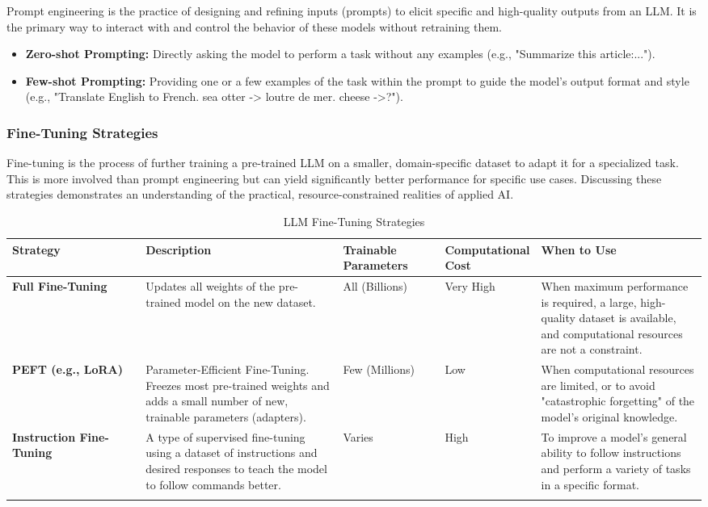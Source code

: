 \documentclass[11pt,a4paper]{article}
\begin{document}
Prompt engineering is the practice of designing and refining inputs (prompts) to elicit specific and high-quality outputs from an LLM. It is the primary way to interact with and control the behavior of these models without retraining them.
\begin{itemize}
    \item \textbf{Zero-shot Prompting:} Directly asking the model to perform a task without any examples (e.g., "Summarize this article:...").
    \item \textbf{Few-shot Prompting:} Providing one or a few examples of the task within the prompt to guide the model's output format and style (e.g., "Translate English to French. sea otter -> loutre de mer. cheese ->?").
\end{itemize}

\subsubsection{Fine-Tuning Strategies}

Fine-tuning is the process of further training a pre-trained LLM on a smaller, domain-specific dataset to adapt it for a specialized task. This is more involved than prompt engineering but can yield significantly better performance for specific use cases. Discussing these strategies demonstrates an understanding of the practical, resource-constrained realities of applied AI.

\begin{longtable}{p{0.2\linewidth} p{0.3\linewidth} p{0.15\linewidth} p{0.1\linewidth} p{0.25\linewidth}}
\toprule
\textbf{Strategy} & \textbf{Description} & \textbf{Trainable Parameters} & \textbf{Computational Cost} & \textbf{When to Use} \\
\midrule
\endhead
\textbf{Full Fine-Tuning} & Updates all weights of the pre-trained model on the new dataset. & All (Billions) & Very High & When maximum performance is required, a large, high-quality dataset is available, and computational resources are not a constraint. \\
\midrule
\textbf{PEFT (e.g., LoRA)} & Parameter-Efficient Fine-Tuning. Freezes most pre-trained weights and adds a small number of new, trainable parameters (adapters). & Few (Millions) & Low & When computational resources are limited, or to avoid "catastrophic forgetting" of the model's original knowledge. \\
\midrule
\textbf{Instruction Fine-Tuning} & A type of supervised fine-tuning using a dataset of instructions and desired responses to teach the model to follow commands better. & Varies & High & To improve a model's general ability to follow instructions and perform a variety of tasks in a specific format. \\
\bottomrule
\caption{LLM Fine-Tuning Strategies}
\end{longtable}
\end{document}
